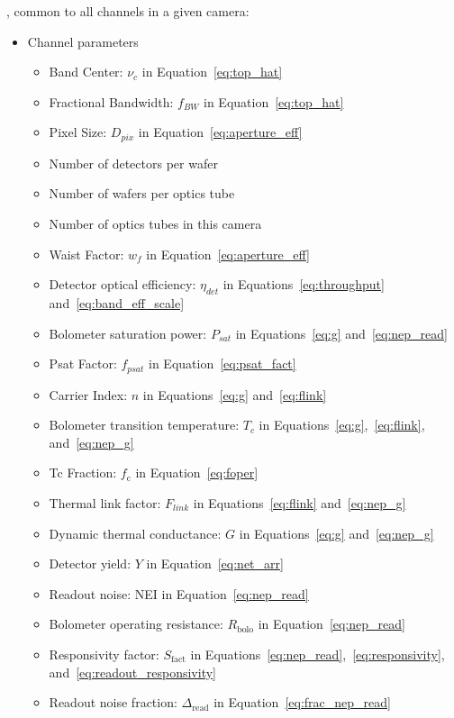 \noindent
{}, common to all channels in a given camera:
\begin{itemize}
    \item Channel parameters
        \begin{itemize}
        \item Band Center: $\nu_{c}$ in Equation~\ref{eq:top_hat}
        \item Fractional Bandwidth: $f_{BW}$ in Equation~\ref{eq:top_hat}
        \item Pixel Size: $D_{pix}$ in Equation~\ref{eq:aperture_eff}
        \item Number of detectors per wafer
        \item Number of wafers per optics tube
        \item Number of optics tubes in this camera
        \item Waist Factor: $w_{f}$ in Equation~\ref{eq:aperture_eff}
        \item Detector optical efficiency: $\eta_{det}$ in Equations~\ref{eq:throughput} and~\ref{eq:band_eff_scale}
        \item Bolometer saturation power: $P_{sat}$ in Equations~\ref{eq:g} and~\ref{eq:nep_read}
        \item Psat Factor: $f_{psat}$ in Equation~\ref{eq:psat_fact}
        \item Carrier Index: $n$ in Equations~\ref{eq:g} and~\ref{eq:flink}
        \item Bolometer transition temperature: $T_{c}$ in Equations~\ref{eq:g},~\ref{eq:flink}, and~\ref{eq:nep_g}
        \item Tc Fraction: $f_{\mathrm{c}}$ in Equation~\ref{eq:foper}
        \item Thermal link factor: $F_{link}$ in Equations~\ref{eq:flink} and~\ref{eq:nep_g} \item Dynamic thermal conductance: $G$ in Equations~\ref{eq:g} and~\ref{eq:nep_g}
        \item Detector yield: $Y$ in Equation~\ref{eq:net_arr}
        \item Readout noise: NEI in Equation~\ref{eq:nep_read}
        \item Bolometer operating resistance: $R_{\mathrm{bolo}}$ in Equation~\ref{eq:nep_read}
        \item Responsivity factor: $S_{\mathrm{fact}}$ in Equations~\ref{eq:nep_read},~\ref{eq:responsivity}, and~\ref{eq:readout_responsivity}
        \item Readout noise fraction: $\Delta_{\mathrm{read}}$ in Equation~\ref{eq:frac_nep_read}

\end{itemize}
\end{itemize}
